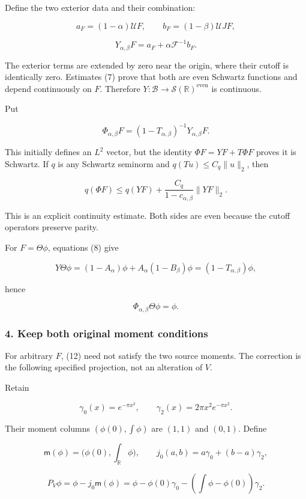 Define the two exterior data and their combination:

\[a_F=(1-\alpha)\mathcal U F,\qquad
b_F=(1-\beta)\mathcal U JF,\]

\[Y_{\alpha,\beta}F=a_F+\alpha\mathcal F^{-1}b_F.\tag{11}\]

The exterior terms are extended by zero near the origin, where their cutoff is identically zero.
Estimates (7) prove that both are even Schwartz functions and depend continuously on \(F\).
Therefore \(Y:\mathscr B\to\mathcal S(\mathbb R)^{\mathrm{even}}\) is continuous.

Put

\[\Phi_{\alpha,\beta}F=(1-T_{\alpha,\beta})^{-1}Y_{\alpha,\beta}F.\tag{12}\]

This initially defines an \(L^2\) vector, but the identity \(\Phi F=YF+T\Phi F\) proves it is
Schwartz. If \(q\) is any Schwartz seminorm and \(q(Tu)\le C_q\|u\|_2\), then

\[q(\Phi F)\le q(YF)+\frac{C_q}{1-c_{\alpha,\beta}}\|YF\|_2.\tag{13}\]

This is an explicit continuity estimate. Both sides are even because the cutoff operators preserve
parity.

For \(F=\Theta\phi\), equations (8) give

\[Y\Theta\phi=(1-A_\alpha)\phi+A_\alpha(1-B_\beta)\phi
=(1-T_{\alpha,\beta})\phi,\]

hence

\[\boxed{\Phi_{\alpha,\beta}\Theta\phi=\phi.}\tag{14}\]

\subsubsection{4. Keep both original moment conditions}\label{pr_10:keep-both-original-moment-conditions}

For arbitrary \(F\), (12) need not satisfy the two source moments. The correction is the following
specified projection, not an alteration of \(V\).

Retain

\[\gamma_0(x)=e^{-\pi x^2},\qquad
\gamma_2(x)=2\pi x^2e^{-\pi x^2}.\]

Their moment columns \((\phi(0),\int\phi)\) are \((1,1)\) and \((0,1)\). Define

\[\mathsf m(\phi)=\bigl(\phi(0),\int_{\mathbb R}\phi\bigr),\qquad
j_0(a,b)=a\gamma_0+(b-a)\gamma_2,\]

\[P_V\phi=\phi-j_0\mathsf m(\phi)
=\phi-\phi(0)\gamma_0-\left(\int\phi-\phi(0)\right)\gamma_2.\tag{15}\]

